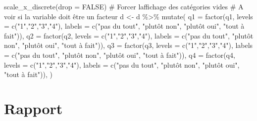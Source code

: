 \documentclass[
  letterpaper,
  DIV=11,
  numbers=noendperiod]{scrreprt}
\newenvironment{Shaded}{\begin{snugshade}}{\end{snugshade}}
\newcommand{\AttributeTok}[1]{\textcolor[rgb]{0.40,0.45,0.13}{#1}}
\newcommand{\CommentTok}[1]{\textcolor[rgb]{0.37,0.37,0.37}{#1}}
\newcommand{\ConstantTok}[1]{\textcolor[rgb]{0.56,0.35,0.01}{#1}}
\newcommand{\FunctionTok}[1]{\textcolor[rgb]{0.28,0.35,0.67}{#1}}
\newcommand{\NormalTok}[1]{\textcolor[rgb]{0.00,0.23,0.31}{#1}}
\newcommand{\OtherTok}[1]{\textcolor[rgb]{0.00,0.23,0.31}{#1}}
\newcommand{\SpecialCharTok}[1]{\textcolor[rgb]{0.37,0.37,0.37}{#1}}
\newcommand{\StringTok}[1]{\textcolor[rgb]{0.13,0.47,0.30}{#1}}
\begin{document}
\begin{Shaded}
\begin{Highlighting}[]
    \FunctionTok{scale\_x\_discrete}\NormalTok{(}\AttributeTok{drop =} \ConstantTok{FALSE}\NormalTok{) }\CommentTok{\# Forcer l\textquotesingle{}affichage des catégories vides}
\CommentTok{\# A voir si la variable doit être un facteur}
\NormalTok{d }\OtherTok{\textless{}{-}}\NormalTok{ d }\SpecialCharTok{\%\textgreater{}\%} 
  \FunctionTok{mutate}\NormalTok{(}
         \AttributeTok{q1 =} \FunctionTok{factor}\NormalTok{(q1, }\AttributeTok{levels =} \FunctionTok{c}\NormalTok{(}\StringTok{"1"}\NormalTok{,}\StringTok{"2"}\NormalTok{,}\StringTok{"3"}\NormalTok{,}\StringTok{"4"}\NormalTok{), }\AttributeTok{labels =} \FunctionTok{c}\NormalTok{(}\StringTok{"pas du tout"}\NormalTok{, }\StringTok{"plutôt non"}\NormalTok{, }\StringTok{"plutôt oui"}\NormalTok{, }\StringTok{"tout à fait"}\NormalTok{)),}
         \AttributeTok{q2 =} \FunctionTok{factor}\NormalTok{(q2, }\AttributeTok{levels =} \FunctionTok{c}\NormalTok{(}\StringTok{"1"}\NormalTok{,}\StringTok{"2"}\NormalTok{,}\StringTok{"3"}\NormalTok{,}\StringTok{"4"}\NormalTok{), }\AttributeTok{labels =} \FunctionTok{c}\NormalTok{(}\StringTok{"pas du tout"}\NormalTok{, }\StringTok{"plutôt non"}\NormalTok{, }\StringTok{"plutôt oui"}\NormalTok{, }\StringTok{"tout à fait"}\NormalTok{)),}
         \AttributeTok{q3 =} \FunctionTok{factor}\NormalTok{(q3, }\AttributeTok{levels =} \FunctionTok{c}\NormalTok{(}\StringTok{"1"}\NormalTok{,}\StringTok{"2"}\NormalTok{,}\StringTok{"3"}\NormalTok{,}\StringTok{"4"}\NormalTok{), }\AttributeTok{labels =} \FunctionTok{c}\NormalTok{(}\StringTok{"pas du tout"}\NormalTok{, }\StringTok{"plutôt non"}\NormalTok{, }\StringTok{"plutôt oui"}\NormalTok{, }\StringTok{"tout à fait"}\NormalTok{)),}
         \AttributeTok{q4 =} \FunctionTok{factor}\NormalTok{(q4, }\AttributeTok{levels =} \FunctionTok{c}\NormalTok{(}\StringTok{"1"}\NormalTok{,}\StringTok{"2"}\NormalTok{,}\StringTok{"3"}\NormalTok{,}\StringTok{"4"}\NormalTok{), }\AttributeTok{labels =} \FunctionTok{c}\NormalTok{(}\StringTok{"pas du tout"}\NormalTok{, }\StringTok{"plutôt non"}\NormalTok{, }\StringTok{"plutôt oui"}\NormalTok{, }\StringTok{"tout à fait"}\NormalTok{)),}
\NormalTok{  )}
\end{Highlighting}
\end{Shaded}


\hypertarget{rapport}{%
\chapter{Rapport}\label{rapport}}
\end{document}
